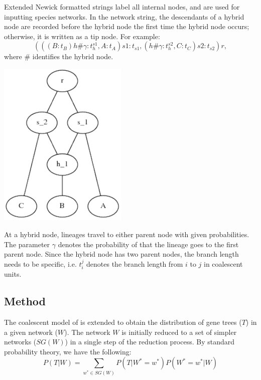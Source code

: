 Extended Newick formatted strings \citep{Cardona12008,Huson2010} label all internal nodes, and are used for inputting species networks. In the network string, the descendants of a hybrid node are recorded before the hybrid node the first time the hybrid node occurs; otherwise, it is written as a tip node. For example:
\begin{equation}
(((B:t_B)h\#\gamma:t^{s1}_{h},A:t_A)s1:t_{s1},(h\#\gamma:t^{s2}_{h},C:t_{C})s2:t_{s2})r,\label{coal_man:ext_no_root}
\end{equation}
where $\#$ identifies the hybrid node.
\begin{center}
\includegraphics[height=8cm]{net_eg.pdf}
\end{center}
\indent At a hybrid node, lineages travel to either parent node with given probabilities. The parameter $\gamma$ denotes the probability of that the lineage goes to the first parent node.
Since the hybrid node has two parent nodes, the branch length needs to be specific, i.e. $t_{i}^j$ denotes the branch length from $i$ to $j$ in coalescent units.

\subsection{Method}
The coalescent model of \citet{Degnan2005} is extended to obtain the distribution of gene trees ($T$) in a given network ($W$). The network $W$ is initially reduced to a set of simpler networks ($SG(W)$) in a single step of the reduction process. By standard probability theory, we have the following:
\begin{equation*}%
P(T|W)=\sum_{w^*\in SG(W)}P(T|W^*=w^*)P(W^*=w^*|W)
\label{coal_man:eqn:recursion}\end{equation*}

